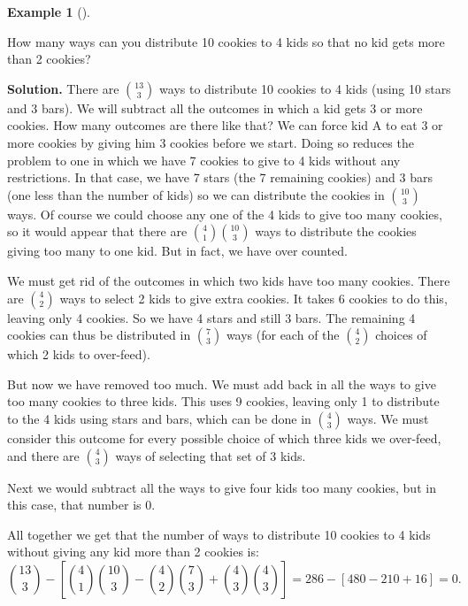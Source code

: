 \documentclass[10pt,]{book}
\theoremstyle{plain}
\theoremstyle{definition}
\newtheorem{example}[theorem]{Example}
\theoremstyle{definition}
\theoremstyle{definition}
\numberwithin{equation}{chapter}
\begin{document}
\begin{example}[]\label{example-47}

          How many ways can you distribute 10 cookies to 4 kids so that no kid gets more than 2 cookies?
\par\medskip\noindent%
\textbf{Solution.}\quad
          There are \({13 \choose 3}\) ways to distribute 10 cookies to 4 kids (using 10 stars and 3 bars).  We will subtract all the outcomes in which a kid gets 3 or more cookies. How many outcomes are there like that? We can force kid A to eat 3 or more cookies by giving him 3 cookies before we start. Doing so reduces the problem to one in which we have 7 cookies to give to 4 kids without any restrictions. In that case, we have 7 stars (the 7 remaining cookies) and 3 bars (one less than the number of kids) so we can distribute the cookies in
          \({10 \choose 3}\) ways. Of course we could choose any one of the 4 kids to give too many cookies, so it would appear that there are \({4 \choose 1}{10 \choose 3}\) ways to distribute the cookies giving too many to one kid. But in fact, we have over counted.
\par

          We must get rid of the outcomes in which two kids have too many cookies. There are \({4 \choose 2}\) ways to select 2 kids to give extra cookies. It takes 6 cookies to do this, leaving only 4 cookies. So we have 4 stars and still 3 bars. The remaining 4 cookies can thus be distributed in \({7 \choose 3}\) ways (for each of the \({4 \choose 2}\) choices of which 2 kids to over-feed).
\par

          But now we have removed too much. We must add back in all the ways to give too many cookies to three kids. This uses 9 cookies, leaving only 1 to distribute to the 4 kids using stars and bars, which can be done in \({4 \choose 3}\) ways. We must consider this outcome for every possible choice of which three kids we over-feed, and there are \({4 \choose 3}\) ways of selecting that set of 3 kids.
\par

          Next we would subtract all the ways to give four kids too many cookies, but in this case, that number is 0.
\par

          All together we get that the number of ways to distribute 10 cookies to 4 kids without giving any kid more than 2 cookies is:
          \begin{equation*}
            {13 \choose 3} - \left[{4 \choose 1}{10 \choose 3} - {4 \choose 2}{7 \choose 3} + {4\choose 3}{4\choose 3}\right] = 286 - [480 - 210 + 16] = 0.
          \end{equation*}
\par


\end{example}
\end{document}
